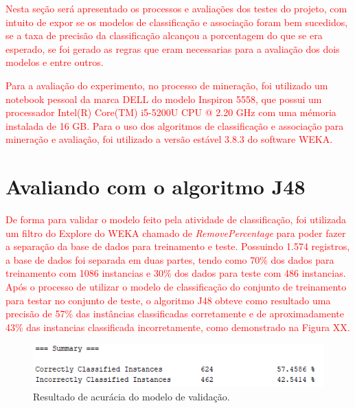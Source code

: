 \label{chapter:Avaliacao}

\par
\textcolor{red}{Nesta seção será apresentado os processos e avaliações dos testes do projeto, com intuito de expor se os modelos de classificação e associação foram bem sucedidos, se a taxa de precisão da classificação alcançou a porcentagem do que se era esperado, se foi gerado as regras que eram necessarias para a avaliação dos dois modelos e entre outros.}

\par
\textcolor{red}{Para a avaliação do experimento, no processo de mineração, foi utilizado um notebook pessoal da marca DELL do modelo Inspiron 5558, que possui um processador Intel(R) Core(TM) i5-5200U CPU @ 2.20 GHz com uma mémoria instalada de 16 GB. Para o uso dos algoritmos de classificação e associação para mineração e avaliação, foi utilizado a versão estável 3.8.3 do software WEKA.}

\section{Avaliando com o algoritmo J48}

\par
\textcolor{red}{De forma para validar o modelo feito pela atividade de classificação, foi utilizada um filtro do Explore do WEKA chamado de \textit{RemovePercentage} para poder fazer a separação da base de dados para treinamento e teste. Possuindo 1.574 registros, a base de dados foi separada em duas partes, tendo como 70\% dos dados para treinamento com 1086 instancias e 30\% dos dados para teste com 486 instancias. Após o processo de utilizar o modelo de classificação do conjunto de treinamento para testar no conjunto de teste, o algoritmo J48 obteve como resultado uma precisão de 57\% das instâncias classificadas corretamente e de aproximadamente 43\% das instancias classificada incorretamente, como demonstrado na Figura XX.}

\par
\begin{figure}[!htp]
	\begin{center}
    \caption{\label{fig:waveform_fig} Resultado de acurácia do modelo de validação.}
	\includegraphics[scale=0.99]{Figuras/Modelo_de_validacao.png}
	\end{center}
\end{figure}


